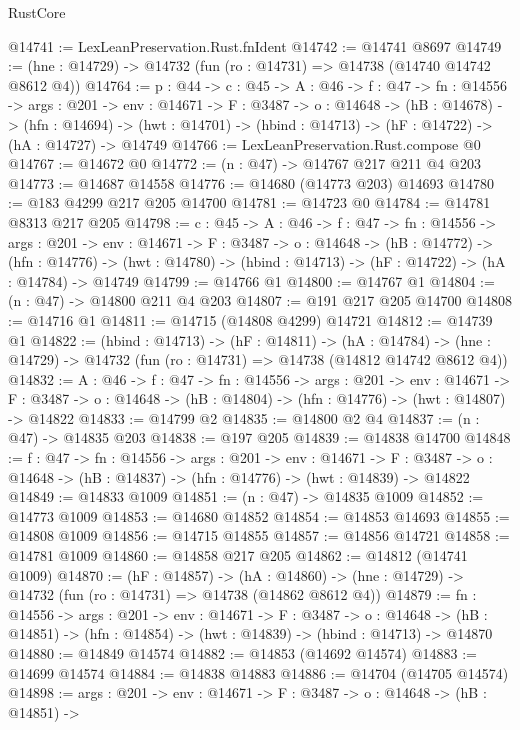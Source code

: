 \begin{lexlean}{RustCore}
\begin{coremodule}
@14741 := LexLeanPreservation.Rust.fnIdent
@14742 := @14741 @8697
@14749 := (hne : @14729) -> @14732 (fun (ro : @14731) => @14738 (@14740 @14742 @8612 @4))
@14764 := {p : @44} ->
  {c : @45} ->
  {A : @46} ->
  {f : @47} ->
  {fn : @14556} ->
  {args : @201} ->
  {env : @14671} ->
  {F : @3487} ->
  {o : @14648} ->
  (hB : @14678) ->
  (hfn : @14694) -> (hwt : @14701) -> (hbind : @14713) -> (hF : @14722) -> (hA : @14727) -> @14749
@14766 := LexLeanPreservation.Rust.compose @0
@14767 := @14672 @0
@14772 := (n : @47) -> @14767 @217 @211 @4 @203
@14773 := @14687 @14558
@14776 := @14680 (@14773 @203) @14693
@14780 := @183 @4299 @217 @205 @14700
@14781 := @14723 @0
@14784 := @14781 @8313 @217 @205
@14798 := {c : @45} ->
  {A : @46} ->
  {f : @47} ->
  {fn : @14556} ->
  {args : @201} ->
  {env : @14671} ->
  {F : @3487} ->
  {o : @14648} ->
  (hB : @14772) ->
  (hfn : @14776) -> (hwt : @14780) -> (hbind : @14713) -> (hF : @14722) -> (hA : @14784) -> @14749
@14799 := @14766 @1
@14800 := @14767 @1
@14804 := (n : @47) -> @14800 @211 @4 @203
@14807 := @191 @217 @205 @14700
@14808 := @14716 @1
@14811 := @14715 (@14808 @4299) @14721
@14812 := @14739 @1
@14822 := (hbind : @14713) ->
  (hF : @14811) ->
  (hA : @14784) -> (hne : @14729) -> @14732 (fun (ro : @14731) => @14738 (@14812 @14742 @8612 @4))
@14832 := {A : @46} ->
  {f : @47} ->
  {fn : @14556} ->
  {args : @201} ->
  {env : @14671} ->
  {F : @3487} -> {o : @14648} -> (hB : @14804) -> (hfn : @14776) -> (hwt : @14807) -> @14822
@14833 := @14799 @2
@14835 := @14800 @2 @4
@14837 := (n : @47) -> @14835 @203
@14838 := @197 @205
@14839 := @14838 @14700
@14848 := {f : @47} ->
  {fn : @14556} ->
  {args : @201} ->
  {env : @14671} ->
  {F : @3487} -> {o : @14648} -> (hB : @14837) -> (hfn : @14776) -> (hwt : @14839) -> @14822
@14849 := @14833 @1009
@14851 := (n : @47) -> @14835 @1009
@14852 := @14773 @1009
@14853 := @14680 @14852
@14854 := @14853 @14693
@14855 := @14808 @1009
@14856 := @14715 @14855
@14857 := @14856 @14721
@14858 := @14781 @1009
@14860 := @14858 @217 @205
@14862 := @14812 (@14741 @1009)
@14870 := (hF : @14857) ->
  (hA : @14860) -> (hne : @14729) -> @14732 (fun (ro : @14731) => @14738 (@14862 @8612 @4))
@14879 := {fn : @14556} ->
  {args : @201} ->
  {env : @14671} ->
  {F : @3487} ->
  {o : @14648} -> (hB : @14851) -> (hfn : @14854) -> (hwt : @14839) -> (hbind : @14713) -> @14870
@14880 := @14849 @14574
@14882 := @14853 (@14692 @14574)
@14883 := @14699 @14574
@14884 := @14838 @14883
@14886 := @14704 (@14705 @14574)
@14898 := {args : @201} ->
  {env : @14671} ->
  {F : @3487} ->
  {o : @14648} ->
  (hB : @14851) ->

\end{coremodule}
\end{lexlean}
